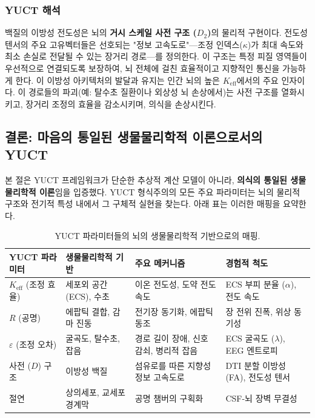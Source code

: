 \documentclass[12pt,a4paper]{article}
\begin{document}
	\subsubsection*{YUCT 해석}
	백질의 이방성 전도성은 뇌의 \textbf{거시 스케일 사전 구조 (\(D_2\))}의 물리적 구현이다. 전도성 텐서의 주요 고유벡터들은 선호되는 "정보 고속도로"—조정 인덱스(\(\kappa\))가 최대 속도와 최소 손실로 전달될 수 있는 장거리 경로—를 정의한다. 이 구조는 특정 피질 영역들이 우선적으로 연결되도록 보장하여, 뇌 전체에 걸친 효율적이고 지향적인 통신을 가능하게 한다. 이 이방성 아키텍처의 발달과 유지는 인간 뇌의 높은 \(K_{\mathrm{eff}}\)에서의 주요 인자이다. 이 경로들의 파괴(예: 탈수초 질환이나 외상성 뇌 손상에서)는 사전 구조를 열화시키고, 장거리 조정의 효율을 감소시키며, 의식을 손상시킨다.
	
	\subsection{결론: 마음의 통일된 생물물리학적 이론으로서의 YUCT}
	
	본 절은 YUCT 프레임워크가 단순한 추상적 계산 모델이 아니라, \textbf{의식의 통일된 생물물리학적 이론}임을 입증했다. YUCT 형식주의의 모든 주요 파라미터는 뇌의 물리적 구조와 전기적 특성 내에서 그 구체적 실현을 찾는다. 아래 표는 이러한 매핑을 요약한다.
	
	\begin{table}[H]
		\centering
		\caption{YUCT 파라미터들의 뇌의 생물물리학적 기반으로의 매핑.}
		\label{tab:biophysical-mapping}
		\small
		\begin{tabular}{p{3cm} p{4cm} p{5cm} p{3cm}}
			\toprule
			\textbf{YUCT 파라미터} & \textbf{생물물리학적 기반} & \textbf{주요 메커니즘} & \textbf{경험적 척도} \\
			\midrule
			\(K_{\mathrm{eff}}\) (조정 효율) & 세포외 공간 (ECS), 수초 & 이온 전도성, 도약 전도 속도 & ECS 부피 분율 (\(\alpha\)), 전도 속도 \\
			\(R\) (공명) & 에팝틱 결합, 감마 진동 & 전기장 동기화, 에팝틱 동조 & 장 전위 진폭, 위상 동기성 \\
			\(\varepsilon\) (조정 오차) & 굴곡도, 탈수초, 잡음 & 경로 길이 장애, 신호 감쇠, 병리적 잡음 & ECS 굴곡도 (\(\lambda\)), EEG 엔트로피 \\
			사전 (\(D\)) 구조 & 이방성 백질 & 섬유로를 따른 지향성 정보 고속도로 & DTI 분할 이방성 (FA), 전도성 텐서 \\
			절연 & 상의세포, 교세포 경계막 & 공명 챔버의 구획화 & CSF-뇌 장벽 무결성 \\
			\bottomrule
		\end{tabular}
	\end{table}
	
\end{document}
